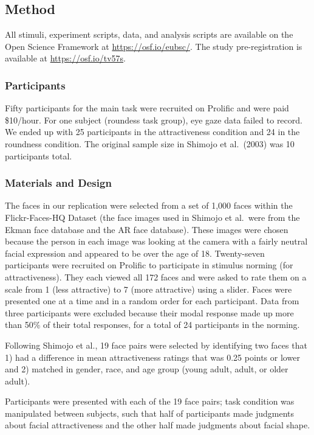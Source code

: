 \documentclass[
  man,floatsintext]{apa6}
\begin{document}
\subsection{Method}\label{method-5}

All stimuli, experiment scripts, data, and analysis scripts are
available on the Open Science Framework at \url{https://osf.io/eubsc/}.
The study pre-registration is available at
\url{https://osf.io/tv57s}.

\subsubsection{Participants}\label{participants-6}

Fifty participants for the main task were recruited on Prolific and were
paid \$10/hour. For one subject (roundess task group), eye gaze data failed to record. We ended up with 25 participants in the attractiveness condition and 24 in the roundness condition. The original sample size in Shimojo et al.~(2003) was 10 participants total.

\subsubsection{Materials and Design}\label{materials-and-design-5}

The faces in our replication were selected from a set of 1,000 faces
within the Flickr-Faces-HQ Dataset (the face images used in Shimojo et
al.~were from the Ekman face database and the AR face database). These
images were chosen because the person in each image was looking at the
camera with a fairly neutral facial expression and appeared to be over
the age of 18. Twenty-seven participants were recruited on Prolific to participate in stimulus norming (for attractiveness). They each viewed all 172 faces and were asked to rate them on a scale from 1 (less attractive) to 7 (more attractive) using a slider. Faces were presented one at a time and in a random order for each participant. Data from three participants were excluded because
their modal response made up more than 50\% of their total responses, for a total of 24 participants in the norming.

Following Shimojo et al., 19 face pairs were selected by
identifying two faces that 1) had a difference in mean attractiveness ratings
that was 0.25 points or lower and 2) matched in gender, race, and age
group (young adult, adult, or older adult).

Participants were presented with each of the 19 face pairs; task condition was manipulated between subjects, such that half of participants made judgments about facial attractiveness and the other half made judgments about facial shape.
\end{document}

